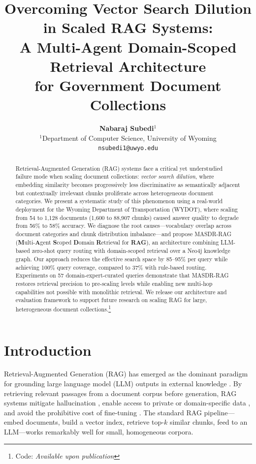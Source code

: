 \documentclass[11pt,a4paper]{article}
\title{Overcoming Vector Search Dilution in Scaled RAG Systems:\\
A Multi-Agent Domain-Scoped Retrieval Architecture\\for Government Document Collections}
\author{
  \textbf{Nabaraj Subedi}$^{1}$ \\
  $^{1}$Department of Computer Science, University of Wyoming \\
  \texttt{nsubedi1@uwyo.edu}
}
\date{}
\newcommand{\systemname}{\textsc{MASDR-RAG}}
\newcommand{\numDocs}{1{,}128}
\newcommand{\numChunks}{88{,}907}
\begin{document}
\maketitle

\begin{abstract}
Retrieval-Augmented Generation (RAG) systems face a critical yet understudied failure mode when scaling document collections: \textit{vector search dilution}, where embedding similarity becomes progressively less discriminative as semantically adjacent but contextually irrelevant chunks proliferate across heterogeneous document categories. We present a systematic study of this phenomenon using a real-world deployment for the Wyoming Department of Transportation (WYDOT), where scaling from 54 to \numDocs{} documents (1,600 to \numChunks{} chunks) caused answer quality to degrade from 56\% to 58\% accuracy. We diagnose the root causes---vocabulary overlap across document categories and chunk distribution imbalance---and propose \systemname{} (\textbf{M}ulti-\textbf{A}gent \textbf{S}coped \textbf{D}omain \textbf{R}etrieval for \textbf{RAG}), an architecture combining LLM-based zero-shot query routing with domain-scoped retrieval over a Neo4j knowledge graph. Our approach reduces the effective search space by 85--95\% per query while achieving 100\% query coverage, compared to 37\% with rule-based routing. Experiments on 57 domain-expert-curated queries demonstrate that \systemname{} restores retrieval precision to pre-scaling levels while enabling new multi-hop capabilities not possible with monolithic retrieval. We release our architecture and evaluation framework to support future research on scaling RAG for large, heterogeneous document collections.\footnote{Code: \textit{Available upon publication}}
\end{abstract}

\section{Introduction}
\label{sec:introduction}

Retrieval-Augmented Generation (RAG) has emerged as the dominant paradigm for grounding large language model (LLM) outputs in external knowledge \cite{lewis2020rag, guu2020realm}. By retrieving relevant passages from a document corpus before generation, RAG systems mitigate hallucination \cite{shuster2021retrieval, huang2023hallucination}, enable access to private or domain-specific data \cite{gao2024ragsurvey}, and avoid the prohibitive cost of fine-tuning \cite{izacard2023atlas}. The standard RAG pipeline---embed documents, build a vector index, retrieve top-$k$ similar chunks, feed to an LLM---works remarkably well for small, homogeneous corpora.
\end{document}
